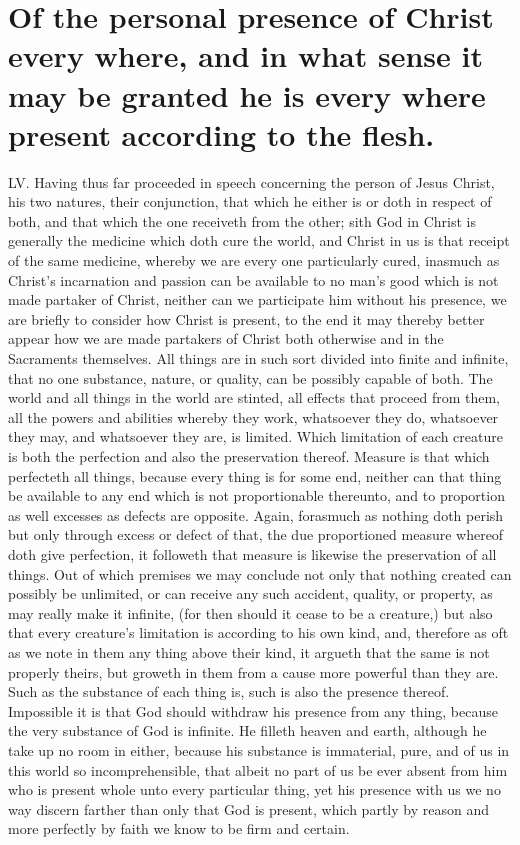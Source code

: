 \section*{Of the personal presence of Christ every where, and in what sense it may be granted he is every where present according to the flesh.}
LV. Having thus far proceeded in speech concerning the person of Jesus Christ, his two natures, their conjunction, that which he either is or doth in respect of both, and that which the one receiveth from the other; sith God in Christ is generally the medicine which doth cure the world, and Christ in us is that receipt of the same medicine, whereby we are every one particularly cured, inasmuch as Christ’s incarnation and passion can be available to no man’s good which is not made partaker of Christ, neither can we participate him without his presence, we are briefly to consider how Christ is present, to the end it may thereby better appear how we are made partakers of Christ both otherwise and in the Sacraments themselves.
All things are in such sort divided into finite and infinite, that no one substance, nature, or quality, can be possibly capable of both. The world and all things in the world are stinted, all effects that proceed from them, all the powers and abilities whereby they work, whatsoever they do, whatsoever they may, and whatsoever they are, is limited. Which limitation  of each creature is both the perfection and also the preservation thereof. Measure is that which perfecteth all things, because every thing is for some end, neither can that thing be available to any end which is not proportionable thereunto, and to proportion as well excesses as defects are opposite. Again, forasmuch as nothing doth perish but only through excess or defect of that, the due proportioned measure whereof doth give perfection, it followeth that measure is likewise the preservation of all things. Out of which premises we may conclude not only that nothing created can possibly be unlimited, or can receive any such accident, quality, or property, as may really make it infinite, (for then should it cease to be a creature,) but also that every creature’s limitation is according to his own kind, and, therefore as oft as we note in them any thing above their kind, it argueth that the same is not properly theirs, but groweth in them from a cause more powerful than they are.
Such as the substance of each thing is, such is also the presence thereof. Impossible it is that God should withdraw his presence from any thing, because the very substance of God is infinite. He filleth heaven and earth, although he take up no room in either, because his substance is immaterial, pure, and of us in this world so incomprehensible, that albeit no part of us be ever absent from him who is present whole unto every particular thing, yet his presence with us we no way discern farther than only that God is present, which partly by reason and more perfectly by faith we know to be firm and certain.
